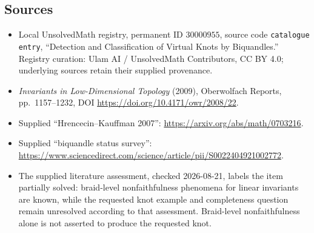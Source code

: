 \documentclass[11pt]{article}
\begin{document}
\subsection{Sources}
\begin{itemize}
\item Local UnsolvedMath registry, permanent ID \(30000955\), source code \texttt{catalogue entry}, ``Detection and Classification of Virtual Knots by Biquandles.'' Registry curation: Ulam AI / UnsolvedMath Contributors, CC BY 4.0; underlying sources retain their supplied provenance.
\item \emph{Invariants in Low-Dimensional Topology} (2009), Oberwolfach Reports, pp.\ 1157--1232, DOI \url{https://doi.org/10.4171/owr/2008/22}.
\item Supplied ``Hrencecin--Kauffman 2007'': \url{https://arxiv.org/abs/math/0703216}.
\item Supplied ``biquandle status survey'': \url{https://www.sciencedirect.com/science/article/pii/S0022404921002772}.
\item The supplied literature assessment, checked 2026-08-21, labels the item partially solved: braid-level nonfaithfulness phenomena for linear invariants are known, while the requested knot example and completeness question remain unresolved according to that assessment. Braid-level nonfaithfulness alone is not asserted to produce the requested knot.
\end{itemize}
\end{document}
